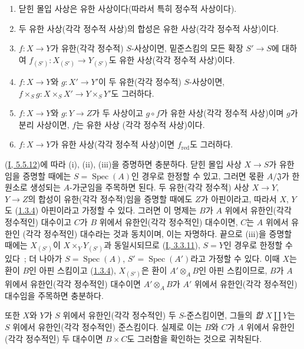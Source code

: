 \begin{proposition}[6.1.5]
\label{II.6.1.5-ko}
\begin{enumerate}
\item[(i)] 닫힌 몰입 사상은 유한 사상이다(따라서 특히 정수적 사상이다).
\item[(ii)] 두 유한 사상(각각 정수적 사상)의 합성은 유한 사상(각각
정수적 사상)이다.
\item[(iii)] $f:X\to Y$가 유한(각각 정수적) $S$-사상이면, 밑준스킴의
모든 확장 $S'\to S$에 대하여
$f_{(S')}:X_{(S')}\to Y_{(S')}$도 유한 사상(각각 정수적 사상)이다.
\item[(iv)] $f:X\to Y$와 $g:X'\to Y'$이 두 유한(각각 정수적)
$S$-사상이면,
$f\times_S g:X\times_S X'\to Y\times_S Y'$도 그러하다.
\item[(v)] $f:X\to Y$와 $g:Y\to Z$가 두 사상이고 $g\circ f$가 유한
사상(각각 정수적 사상)이며 $g$가 분리 사상이면, $f$는 유한 사상
(각각 정수적 사상)이다.
\item[(vi)] $f:X\to Y$가 유한 사상(각각 정수적 사상)이면
$f_{\mathrm{red}}$도 그러하다.
\end{enumerate}
\end{proposition}


(\hyperref[I.5.5.12-ko]{I, 5.5.12})에 따라 (i), (ii), (iii)을 증명하면
충분하다. 닫힌 몰입 사상 $X\to S$가 유한임을 증명할 때에는
$S=\operatorname{Spec}(A)$인 경우로 한정할 수 있고, 그러면 몫환
$A/\mathfrak{J}$가 한 원소로 생성되는 $A$-가군임을 주목하면 된다.
두 유한(각각 정수적) 사상 $X\to Y$, $Y\to Z$의 합성이 유한(각각
정수적)임을 증명할 때에도 $Z$가 아핀이라고, 따라서 $X$, $Y$도
(\hyperref[II.1.3.4-ko]{1.3.4}) 아핀이라고 가정할 수 있다. 그러면 이
명제는 $B$가 $A$ 위에서 유한인(각각 정수적인) 대수이고 $C$가 $B$
위에서 유한인(각각 정수적인) 대수이면, $C$는 $A$ 위에서 유한인
(각각 정수적인) 대수라는 것과 동치이며, 이는 자명하다. 끝으로
(iii)을 증명할 때에는 $X_{(S')}$이 $X\times_Y Y_{(S')}$과 동일시되므로
(\hyperref[I.3.3.11-ko]{I, 3.3.11}), $S=Y$인 경우로 한정할 수 있다~;
더 나아가 $S=\operatorname{Spec}(A)$,
$S'=\operatorname{Spec}(A')$라고 가정할 수 있다. 이때 $X$는 환이
$B$인 아핀 스킴이고 (\hyperref[II.1.3.4-ko]{1.3.4}), $X_{(S')}$은 환이
$A'\otimes_A B$인 아핀 스킴이므로, $B$가 $A$ 위에서 유한인(각각
정수적인) 대수이면 $A'\otimes_A B$가 $A'$ 위에서 유한인(각각
정수적인) 대수임을 주목하면 충분하다.

또한 $X$와 $Y$가 $S$ 위에서 유한인(각각 정수적인) 두 $S$-준스킴이면,
그들의 \emph{합} $X\amalg Y$는 $S$ 위에서 유한인(각각 정수적인)
준스킴이다. 실제로 이는 $B$와 $C$가 $A$ 위에서 유한인(각각 정수적인)
두 대수이면 $B\times C$도 그러함을 확인하는 것으로 귀착된다.

